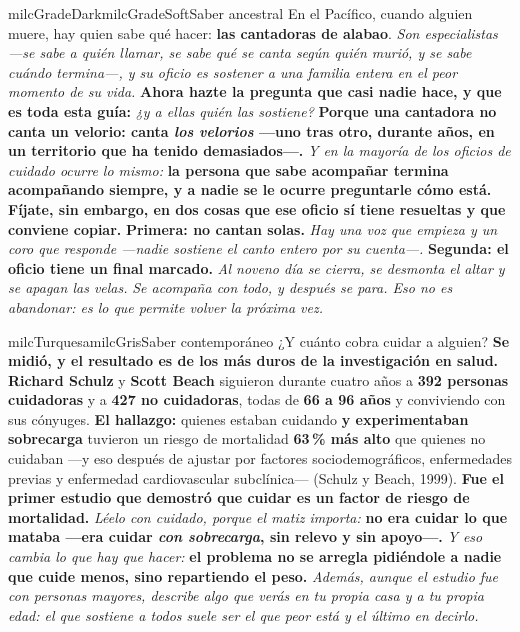 \documentclass[11pt,letterpaper]{article}
\begin{document}
\begin{softbox}{milcGradeDark}{milcGradeSoft}{Saber ancestral}
En el Pacífico, cuando alguien muere, hay quien sabe qué hacer: \textbf{las cantadoras de alabao}. \emph{Son especialistas ---se sabe a quién llamar, se sabe qué se canta según quién murió, y se sabe cuándo termina---, y su oficio es sostener a una familia entera en el peor momento de su vida.} \textbf{Ahora hazte la pregunta que casi nadie hace, y que es toda esta guía:} \emph{¿y a ellas quién las sostiene?} \textbf{Porque una cantadora no canta un velorio: canta \emph{los velorios} ---uno tras otro, durante años, en un territorio que ha tenido demasiados---.} \emph{Y en la mayoría de los oficios de cuidado ocurre lo mismo:} \textbf{la persona que sabe acompañar termina acompañando siempre, y a nadie se le ocurre preguntarle cómo está.} \textbf{Fíjate, sin embargo, en dos cosas que ese oficio sí tiene resueltas y que conviene copiar.} \textbf{Primera: no cantan solas.} \emph{Hay una voz que empieza y un coro que responde ---nadie sostiene el canto entero por su cuenta---.} \textbf{Segunda: el oficio tiene un final marcado.} \emph{Al noveno día se cierra, se desmonta el altar y se apagan las velas.} \emph{Se acompaña con todo, y después se para. Eso no es abandonar: es lo que permite volver la próxima vez.}
\end{softbox}

\begin{softbox}{milcTurquesa}{milcGris}{Saber contemporáneo}
¿Y cuánto cobra cuidar a alguien? \textbf{Se midió, y el resultado es de los más duros de la investigación en salud.} \textbf{Richard Schulz} y \textbf{Scott Beach} siguieron durante cuatro años a \textbf{392 personas cuidadoras} y a \textbf{427 no cuidadoras}, todas de \textbf{66 a 96 años} y conviviendo con sus cónyuges. \textbf{El hallazgo:} quienes estaban cuidando \textbf{y experimentaban sobrecarga} tuvieron un riesgo de mortalidad \textbf{63\,\% más alto} que quienes no cuidaban ---y eso después de ajustar por factores sociodemográficos, enfermedades previas y enfermedad cardiovascular subclínica--- (Schulz y Beach, 1999). \textbf{Fue el primer estudio que demostró que cuidar es un factor de riesgo de mortalidad.} \emph{Léelo con cuidado, porque el matiz importa:} \textbf{no era cuidar lo que mataba ---era cuidar \emph{con sobrecarga}, sin relevo y sin apoyo---.} \emph{Y eso cambia lo que hay que hacer:} \textbf{el problema no se arregla pidiéndole a nadie que cuide menos, sino repartiendo el peso.} \emph{Además, aunque el estudio fue con personas mayores, describe algo que verás en tu propia casa y a tu propia edad: el que sostiene a todos suele ser el que peor está y el último en decirlo.}
\end{softbox}
\end{document}
